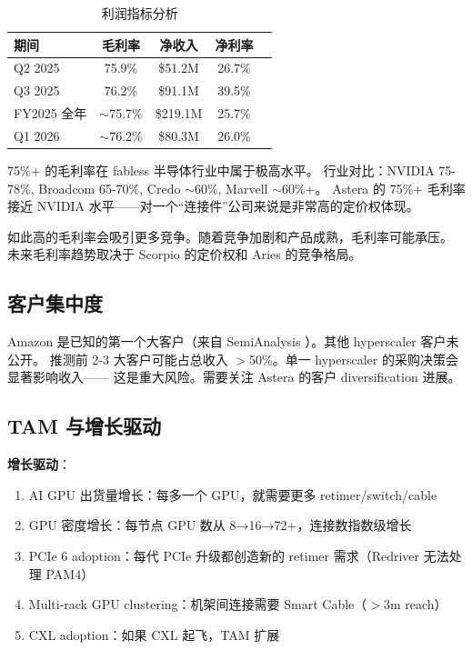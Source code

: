 \begin{table}[htb]
    \centering
    \caption{利润指标分析}
    \label{tab:margins}
    \begin{tabular}{lcccc}
        \toprule
        \textbf{期间} & \textbf{毛利率} & \textbf{净收入} & \textbf{净利率} \\
        \midrule
        Q2 2025 & 75.9\% & \$51.2M & 26.7\% \\
        Q3 2025 & 76.2\% & \$91.1M & 39.5\% \\
        \rowcolor{blue!8}
        FY2025 全年 & $\sim$75.7\% & \$219.1M & 25.7\% \\
        Q1 2026 & $\sim$76.2\% & \$80.3M & 26.0\% \\
        \bottomrule
    \end{tabular}
\end{table}

75\%+ 的毛利率在 fabless 半导体行业中属于极高水平。
行业对比：NVIDIA 75-78\%, Broadcom 65-70\%, Credo $\sim$60\%, Marvell $\sim$60\%+。
Astera 的 75\%+ 毛利率接近 NVIDIA 水平——对一个``连接件''公司来说是非常高的定价权体现。

如此高的毛利率会吸引更多竞争。随着竞争加剧和产品成熟，毛利率可能承压。
未来毛利率趋势取决于 Scorpio 的定价权和 Aries 的竞争格局。

\subsection{客户集中度}

Amazon 是已知的第一个大客户（来自 SemiAnalysis ）。其他 hyperscaler 客户未公开。
推测前 2-3 大客户可能占总收入 $>$50\%。单一 hyperscaler 的采购决策会显著影响收入——
这是重大风险。需要关注 Astera 的客户 diversification 进展。

\subsection{TAM 与增长驱动}

\textbf{增长驱动}：
\begin{enumerate}
    \item AI GPU 出货量增长：每多一个 GPU，就需要更多 retimer/switch/cable
    \item GPU 密度增长：每节点 GPU 数从 8→16→72+，连接数指数级增长
    \item PCIe 6 adoption：每代 PCIe 升级都创造新的 retimer 需求（Redriver 无法处理 PAM4）
    \item Multi-rack GPU clustering：机架间连接需要 Smart Cable（$>$3m reach）
    \item CXL adoption：如果 CXL 起飞，TAM 扩展
\end{enumerate}

